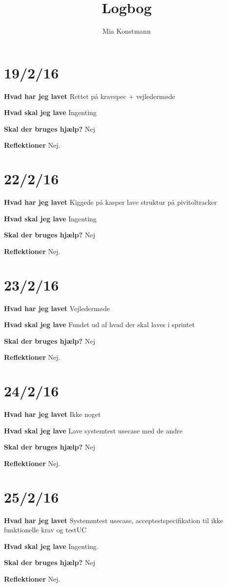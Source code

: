 \documentclass{article}
\title{Logbog}
\author{Mia Konstmann}
\date{}
\begin{document}
	\maketitle
	\tableofcontents
	
	\section{19/2/16}
	\textbf{Hvad har jeg lavet}
	Rettet på kravspec + vejledermøde
	
	\textbf{Hvad skal jeg lave}
	Ingenting
	
	\textbf{Skal der bruges hjælp?}
	Nej
	
	\textbf{Reflektioner}
	Nej.
	
	\section{22/2/16}
	\textbf{Hvad har jeg lavet}
	Kiggede på kasper lave struktur på pivitoltracker
	
	\textbf{Hvad skal jeg lave}
	Ingenting
	
	\textbf{Skal der bruges hjælp?}
	Nej
	
	\textbf{Reflektioner}
	Nej.
	
	\section{23/2/16}
	\textbf{Hvad har jeg lavet}
	Vejledermøde
	
	\textbf{Hvad skal jeg lave}
	Fundet ud af hvad der skal laves i sprintet
	
	\textbf{Skal der bruges hjælp?}
	Nej
	
	\textbf{Reflektioner}
	Nej.
	
	\section{24/2/16}
	\textbf{Hvad har jeg lavet}
	Ikke noget
	
	\textbf{Hvad skal jeg lave}
	Lave systemtest usecase med de andre
	
	\textbf{Skal der bruges hjælp?}
	Nej
	
	\textbf{Reflektioner}
	Nej.	
	
	\section{25/2/16}
	\textbf{Hvad har jeg lavet}
	Systemmtest usecase, acceptestspecifikation til ikke funktionelle krav og testUC
	
	\textbf{Hvad skal jeg lave}
	Ingenting. 
	
	\textbf{Skal der bruges hjælp?}
	Nej
	
	\textbf{Reflektioner}
	Nej.		
\end{document}
